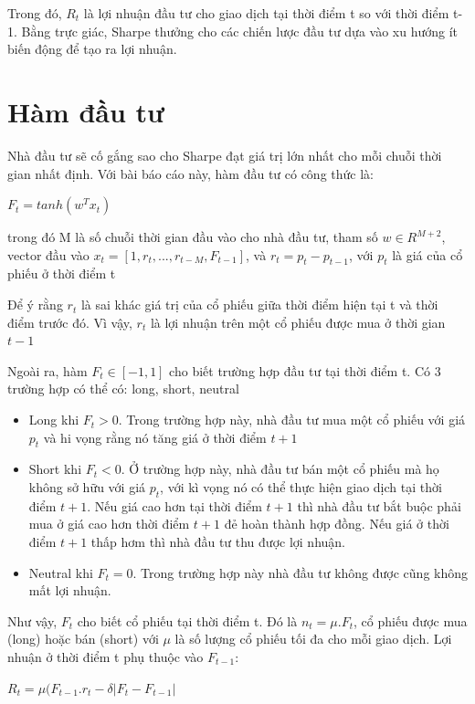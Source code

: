 \documentclass[14pt]{extreport}
\begin{document}
Trong đó, $R_t$ là lợi nhuận đầu tư cho giao dịch tại thời điểm t so với thời điểm t-1. Bằng trực giác, Sharpe thưởng cho các chiến lược đầu tư dựa vào xu hướng ít biến động để tạo ra lợi nhuận.

\section{Hàm đầu tư}

Nhà đầu tư sẽ cố gắng sao cho Sharpe đạt giá trị lớn nhất cho mỗi chuỗi thời gian nhất định. Với bài báo cáo này, hàm đầu tư có công thức là:

\begin{center}
$F_t = tanh(w^T x_t)$
\end{center}

trong đó M là số chuỗi thời gian đầu vào cho nhà đầu tư, tham số $w \in R^{M+2}$, vector đầu vào $x_t=[1,r_t,...,r_{t-M},F_{t-1}]$, và $r_t=p_t - p_{t-1}$, với $p_t$ là giá của cổ phiếu ở thời điểm t

Để ý rằng $r_t$ là sai khác giá trị của cổ phiếu giữa thời điểm hiện tại t và thời điểm trước đó. Vì vậy, $r_t$ là lợi nhuận trên một cổ phiếu được mua ở thời gian $t-1$

Ngoài ra, hàm $F_t \in [-1,1]$ cho biết trường hợp đầu tư tại thời điểm t. Có 3 trường hợp có thể có: long, short, neutral
\begin{itemize}
\item Long khi $F_t > 0$. Trong trường hợp này, nhà đầu tư mua một cổ phiếu với giá $p_t$ và hi vọng rằng nó tăng giá ở thời điểm $t+1$
\item Short khi $F_t <0$. Ở trường hợp này, nhà đầu tư bán một cổ phiếu mà họ không sở hữu với giá $p_t$, với kì vọng nó có thể thực hiện giao dịch tại thời điểm $t+1$. Nếu giá cao hơn tại thời điểm $t+1$ thì nhà đầu tư bắt buộc phải mua ở giá cao hơn thời điểm $t+1$ đẻ hoàn thành hợp đồng. Nếu giá ở thời điểm $t+1$ thấp hơm thì nhà đầu tư thu được lợi nhuận.
\item Neutral khi $F_t=0$. Trong trường hợp này nhà đầu tư không được cũng không mất lợi nhuận.
\end{itemize}

Như vậy, $F_t$ cho biết cổ phiếu tại thời điểm t. Đó là $n_t= \mu .F_t$, cổ phiếu được mua (long) hoặc bán (short) với $\mu$ là số lượng cổ phiếu tối đa cho mỗi giao dịch. Lợi nhuận ở thời điểm t phụ thuộc vào $F_{t-1}$:

\begin{center}
$R_t= \mu (F_{t-1}.r_t- \delta |F_t-F_{t-1}|$
\end{center}
\end{document}
